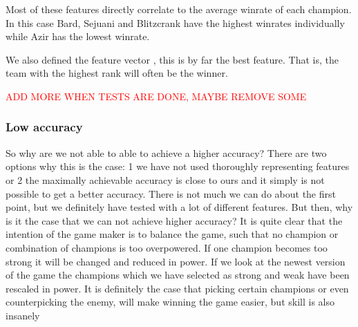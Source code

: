 Most of these features directly correlate to the average winrate of each champion. In this case Bard, Sejuani and Blitzcrank have the highest winrates individually while Azir has the lowest winrate.

We also defined the feature vector , this is by far the best feature. That is, the team with the highest rank will often be the winner.


\textcolor{red}{ADD MORE WHEN TESTS ARE DONE, MAYBE REMOVE SOME}



\subsubsection{Low accuracy}

So why are we not able to able to achieve a higher accuracy? There are two options why this is the case: 1 we have not used thoroughly representing features or 2 the maximally achievable accuracy is close to ours and it simply is not possible to get a better accuracy. There is not much we can do about the first point, but we definitely have tested with a lot of different features. But then, why is it the case that we can not achieve higher accuracy? It is quite clear that the intention of the game maker is to balance the game, such that no champion or combination of champions is too overpowered. If one champion becomes too strong it will be changed and reduced in power. If we look at the newest version of the game the champions which we have selected as strong and weak have been rescaled in power. It is definitely the case that picking certain champions or even counterpicking the enemy, will make winning the game easier, but skill is also insanely





